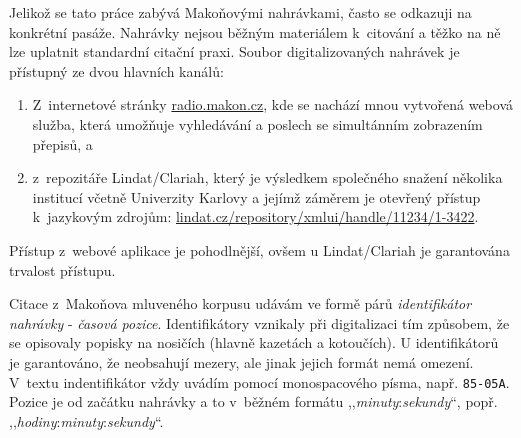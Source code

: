 Jelikož se tato práce zabývá Makoňovými nahrávkami, často se odkazuji na
konkrétní pasáže. Nahrávky nejsou běžným materiálem k~citování a těžko na ně lze
uplatnit standardní citační praxi. Soubor digitalizovaných nahrávek je
přístupný ze dvou hlavních kanálů:
\begin{enumerate}
\item{
  Z~internetové stránky \href{http://radio.makon.cz/}{radio.makon.cz}, kde se nachází mnou vytvořená
  webová služba, která umožňuje vyhledávání a poslech se simultánním zobrazením
  přepisů, a
}
\item{
  z~repozitáře Lindat/Clariah, který je výsledkem společného snažení několika
  institucí včetně Univerzity Karlovy a jejímž záměrem je otevřený přístup
  k~jazykovým zdrojům: \href{https://lindat.cz/repository/xmlui/handle/11234/1-3422}{lindat.cz/repository/xmlui/handle/11234/1-3422}.
}
\end{enumerate}
Přístup z~webové aplikace je pohodlnější, ovšem u Lindat/Clariah je garantována
trvalost přístupu.

Citace z~Makoňova mluveného korpusu udávám ve formě párů \textit{identifikátor
nahrávky} - \textit{časová pozice}. Identifikátory vznikaly při digitalizaci tím
způsobem, že se opisovaly popisky na nosičích (hlavně kazetách a kotoučích). U
identifikátorů je garantováno, že neobsahují mezery, ale jinak jejich formát
nemá omezení. V~textu indentifikátor vždy uvádím pomocí monospacového písma, např.
\texttt{85-05A}. Pozice je od začátku nahrávky a to v~běžném formátu
,,\textit{minuty}:\textit{sekundy}``, popř.
,,\textit{hodiny}:\textit{minuty}:\textit{sekundy}``.
